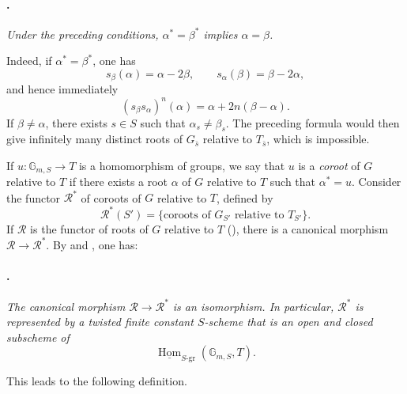\paragraph{.}
\textit{Under the preceding conditions,
\(\alpha^*=\beta^*\) implies \(\alpha=\beta\).}

Indeed, if \(\alpha^*=\beta^*\), one has
\[
  s_\beta(\alpha)=\alpha-2\beta,
  \qquad
  s_\alpha(\beta)=\beta-2\alpha,
\]
and hence immediately
\[
  (s_\beta s_\alpha)^n(\alpha)
  =
  \alpha+2n(\beta-\alpha).
\]
If \(\beta\ne\alpha\), there exists \(s\in S\) such that
\(\alpha_s\ne\beta_s\). The preceding formula would then give
infinitely many distinct roots of \(G_{\bar s}\) relative to
\(T_{\bar s}\), which is impossible.

If \(u:\mathbb G_{m,S}\to T\) is a homomorphism of groups, we say
that \(u\) is a \emph{coroot} of \(G\) relative to \(T\) if there
exists a root \(\alpha\) of \(G\) relative to \(T\) such that
\(\alpha^*=u\). Consider the functor \(\mathcal R^*\) of coroots of
\(G\) relative to \(T\), defined by
\[
  \mathcal R^*(S')
  =
  \{\text{coroots of \(G_{S'}\) relative to \(T_{S'}\)}\}.
\]
If \(\mathcal R\) is the functor of roots of \(G\) relative to \(T\)
(), there is a canonical morphism
\(\mathcal R\to\mathcal R^*\). By  and , one has:

\paragraph{.}
\textit{The canonical morphism
\(\mathcal R\to\mathcal R^*\) is an isomorphism. In particular,
\(\mathcal R^*\) is represented by a twisted finite constant
\(S\)-scheme that is an open and closed subscheme of}
\[
  \underline{\operatorname{Hom}}_{S\text{-gr}}
    (\mathbb G_{m,S},T).
\]

This leads to the following definition.

